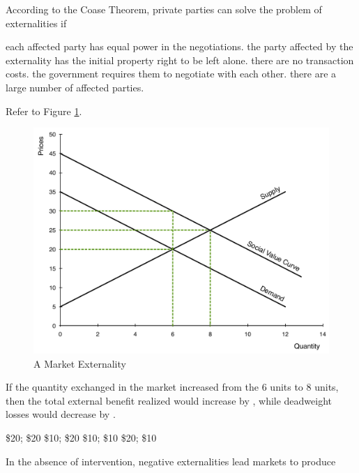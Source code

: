 \documentclass[addpoints,11pt]{exam}
\theoremstyle{definition}
\newcommand{\blank}[0]{\underline{\hspace{3cm}}}
\begin{document}
\begin{questions}
\question According to the Coase Theorem, private parties can solve the problem of externalities if 

\begin{choices}
	\choice each affected party has equal power in the negotiations.
	\choice the party affected by the externality has the initial property right to be left alone.
	\CorrectChoice there are no transaction costs.
	\choice the government requires them to negotiate with each other.
	\choice there are a large number of affected parties.
\end{choices}

\question Refer to Figure \ref{MC5}. 

\begin{figure}[H]
	\centering
	\includegraphics[scale=.40]{Exam_Review5.pdf}
	\caption{A Market Externality}
	\label{MC5}
\end{figure}

If the quantity exchanged in the market increased from the 6 units to 8 units, then the total external benefit realized would increase by \underline{\hspace{3cm}}, while deadweight losses would decrease by \blank.

\begin{choices}
	\choice \$20; \$20
	\choice \$10; \$20
	\choice \$10; \$10
	\CorrectChoice \$20; \$10
\end{choices}

\newpage

\question In the absence of intervention, negative externalities lead markets to produce


\end{questions}
\end{document}
